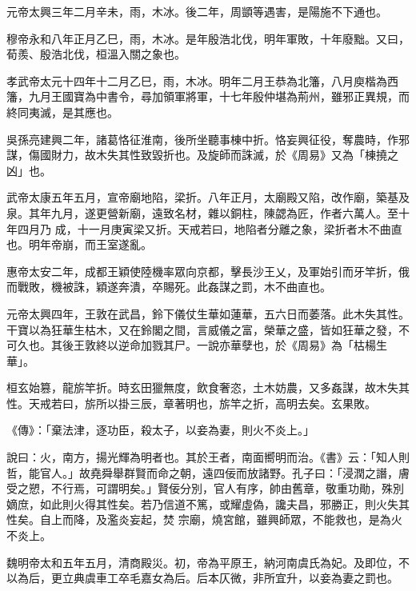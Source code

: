 \begin{pinyinscope}
 元帝太興三年二月辛未，雨，木冰。後二年，周顗等遇害，是陽施不下通也。



 穆帝永和八年正月乙巳，雨，木冰。是年殷浩北伐，明年軍敗，十年廢黜。又曰，荀羨、殷浩北伐，桓溫入關之象也。



 孝武帝太元十四年十二月乙巳，雨，木冰。明年二月王恭為北籓，八月庾楷為西籓，九月王國寶為中書令，尋加領軍將軍，十七年殷仲堪為荊州，雖邪正異規，而終同夷滅，是其應也。



 吳孫亮建興二年，諸葛恪征淮南，後所坐聽事棟中折。恪妄興征役，奪農時，作邪謀，傷國財力，故木失其性致毀折也。及旋師而誅滅，於《周易》又為「棟撓之凶」也。



 武帝太康五年五月，宣帝廟地陷，梁折。八年正月，太廟殿又陷，改作廟，築基及泉。其年九月，遂更營新廟，遠致名材，雜以銅柱，陳勰為匠，作者六萬人。至十年四月乃
 成，十一月庚寅梁又折。天戒若曰，地陷者分離之象，梁折者木不曲直也。明年帝崩，而王室遂亂。



 惠帝太安二年，成都王穎使陸機率眾向京都，擊長沙王乂，及軍始引而牙竿折，俄而戰敗，機被誅，穎遂奔潰，卒賜死。此姦謀之罰，木不曲直也。



 元帝太興四年，王敦在武昌，鈴下儀仗生華如蓮華，五六日而萎落。此木失其性。干寶以為狂華生枯木，又在鈴閣之間，言威儀之富，榮華之盛，皆如狂華之發，不可久也。其後王敦終以逆命加戮其尸。一說亦華孽也，於《周易》為「枯楊生華」。



 桓玄始篡，龍旂竿折。時玄田獵無度，飲食奢恣，土木妨農，又多姦謀，故木失其性。天戒若曰，旂所以掛三辰，章著明也，旂竿之折，高明去矣。玄果敗。



 《傳》：「棄法津，逐功臣，殺太子，以妾為妻，則火不炎上。」



 說曰：火，南方，揚光輝為明者也。其於王者，南面嚮明而治。《書》云：「知人則哲，能官人。」故堯舜舉群賢而命之朝，遠四佞而放諸野。孔子曰：「浸潤之譖，膚受之愬，不行焉，可謂明矣。」賢佞分別，官人有序，帥由舊章，敬重功勛，殊別嫡庶，如此則火得其性矣。若乃信道不篤，或耀虛偽，讒夫昌，邪勝正，則火失其性矣。自上而降，及濫炎妄起，焚
 宗廟，燒宮館，雖興師眾，不能救也，是為火不炎上。



 魏明帝太和五年五月，清商殿災。初，帝為平原王，納河南虞氏為妃。及即位，不以為后，更立典虞車工卒毛嘉女為后。后本仄微，非所宜升，以妾為妻之罰也。




\end{pinyinscope}
